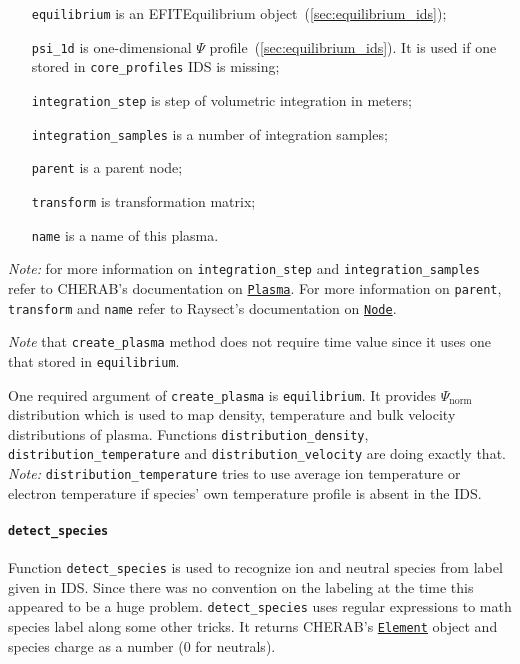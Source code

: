 \documentclass[../main.tex]{subfiles}
\begin{document}
\begin{itemize}[align=left]
    \item[\texttt{equilibrium}] is an EFITEquilibrium object~(\cref{sec:equilibrium_ids});
    \item[\texttt{psi\_1d}] is one-dimensional $\Psi$ profile~(\cref{sec:equilibrium_ids}). It is used if one stored in \texttt{core\_profiles} IDS is missing;
    \item[\texttt{integration\_step}] is step of volumetric integration in meters;
    \item[\texttt{integration\_samples}] is a number of integration samples;
    \item[\texttt{parent}] is a parent node;
    \item[\texttt{transform}] is transformation matrix;
    \item[\texttt{name}] is a name of this plasma.
\end{itemize}
\emph{Note: } for more information on \texttt{integration\_step} and \texttt{integration\_samples} refer to CHERAB's documentation on \href{https://cherab.github.io/documentation/plasmas/core_plasma_classes.html?highlight=plasma#cherab.core.Plasma}{\texttt{Plasma}}.
For more information on \texttt{parent}, \texttt{transform} and \texttt{name} refer to Raysect's documentation on \href{https://raysect.github.io/documentation/api_reference/core/raysect_core_scenegraph.html?highlight=node#raysect.core.scenegraph.node.Node}{\texttt{Node}}.

\emph{Note} that \texttt{create\_plasma} method does not require time value since it uses one that stored in \texttt{equilibrium}.

One required argument of \texttt{create\_plasma} is \texttt{equilibrium}. It provides $\Psi_\text{norm}$ distribution which is used to map density, temperature and bulk velocity distributions of plasma. Functions \texttt{distribution\_density}, \texttt{distribution\_temperature} and \texttt{distribution\_velocity} are doing exactly that. \emph{Note:} \texttt{distribution\_temperature} tries to use average ion temperature or electron temperature if species' own temperature profile is absent in the IDS.

\paragraph{\texttt{detect\_species}}%
\label{par:detect_species}

Function \texttt{detect\_species} is used to recognize ion and neutral species from label given in IDS. Since there was no convention on the labeling at the time this appeared to be a huge problem. \texttt{detect\_species} uses regular expressions to math species label along some other tricks. It returns CHERAB's \href{https://cherab.github.io/documentation/atomic/elements_and_isotopes.html?highlight=element#cherab.core.atomic.elements.Element}{\texttt{Element}} object and species charge as a number (0 for neutrals).
\end{document}
